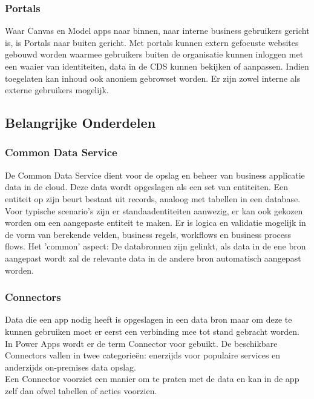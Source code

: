 \subsubsection{Portals}

Waar Canvas en Model apps naar binnen, naar interne business gebruikers gericht is, is Portals naar buiten gericht. Met portals kunnen extern gefocuste websites gebouwd worden waarmee gebruikers buiten de organisatie kunnen inloggen met een waaier van identiteiten, data in de CDS kunnen bekijken of aanpassen. Indien toegelaten kan inhoud ook anoniem gebrowset worden. Er zijn zowel interne als externe gebruikers mogelijk. \autocite{MicrosoftDocs2020a}

\subsection{Belangrijke Onderdelen}

\subsubsection{Common Data Service}

De Common Data Service dient voor de opslag en beheer van business applicatie data in de cloud. Deze data wordt opgeslagen als een set van entiteiten. Een entiteit op zijn beurt bestaat uit records, analoog met tabellen in een database. Voor typische scenario's zijn er standaadentiteiten aanwezig, er kan ook gekozen worden om een aangepaste entiteit te maken. Er is logica en validatie mogelijk in de vorm van berekende velden, business regels, workflows en business process flows. Het 'common' aspect: De databronnen zijn gelinkt, als data in de ene bron aangepast wordt zal de relevante data in de andere bron automatisch aangepast worden. \autocite{MicrosoftDocs2019a}

\subsubsection{Connectors}

Data die een app nodig heeft is opgeslagen in een data bron maar om deze te kunnen gebruiken moet er eerst een verbinding mee tot stand gebracht worden. In Power Apps wordt er de term Connector voor gebuikt. De beschikbare Connectors vallen in twee categorieën: enerzijds voor populaire services en anderzijds on-premises data opslag. \\
Een Connector voorziet een manier om te praten met de data en kan in de app zelf dan ofwel tabellen of acties voorzien.

